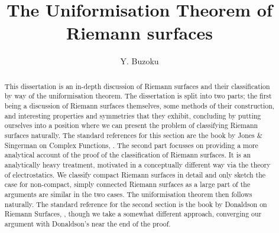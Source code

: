 \documentclass[11pt]{report}
\title{The Uniformisation Theorem of Riemann surfaces}
\author{Y. Buzoku}
\theoremstyle{definition}
\begin{document}
\maketitle
\setcounter{tocdepth}{1}  %
\tableofcontents

\newpage
\begin{abstract}
This dissertation is an in-depth discussion of Riemann surfaces and their classification by way of the uniformisation theorem. The dissertation is split into two parts; the first being a discussion of Riemann surfaces themselves, some methods of their construction, and interesting properties and symmetries that they exhibit, concluding by putting ourselves into a position where we can present the problem of classifying Riemann surfaces naturally. The standard references for this section are the book by Jones \& Singerman on Complex Functions, \cite{comfun}. The second part focusses on providing a more analytical account of the proof of the classification of Riemann surfaces. It is an analytically heavy treatment, motivated in a conceptually different way via the theory of electrostatics. We classify compact Riemann surfaces in detail and only sketch the case for non-compact, simply connected Riemann surfaces as a large part of the arguments are similar in the two cases. The uniformisation theorem then follows naturally. The standard reference for the second section is the book by Donaldson on Riemann Surfaces, \cite{donaldson}, though we take a somewhat different approach, converging our argument with Donaldson's near the end of the proof. 
\end{abstract}
\declaration %
\end{document}
